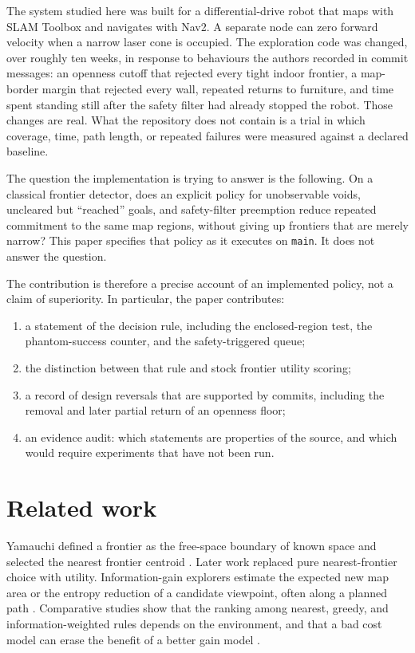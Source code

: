 \documentclass[11pt]{article}
\begin{document}
The system studied here was built for a differential-drive robot that maps with SLAM Toolbox and navigates with Nav2. A separate node can zero forward velocity when a narrow laser cone is occupied. The exploration code was changed, over roughly ten weeks, in response to behaviours the authors recorded in commit messages: an openness cutoff that rejected every tight indoor frontier, a map-border margin that rejected every wall, repeated returns to furniture, and time spent standing still after the safety filter had already stopped the robot. Those changes are real. What the repository does not contain is a trial in which coverage, time, path length, or repeated failures were measured against a declared baseline.

The question the implementation is trying to answer is the following. On a classical frontier detector, does an explicit policy for unobservable voids, uncleared but ``reached'' goals, and safety-filter preemption reduce repeated commitment to the same map regions, without giving up frontiers that are merely narrow? This paper specifies that policy as it executes on \texttt{main}. It does not answer the question.

The contribution is therefore a precise account of an implemented policy, not a claim of superiority. In particular, the paper contributes:
\begin{enumerate}
\item a statement of the decision rule, including the enclosed-region test, the phantom-success counter, and the safety-triggered queue;
\item the distinction between that rule and stock frontier utility scoring;
\item a record of design reversals that are supported by commits, including the removal and later partial return of an openness floor;
\item an evidence audit: which statements are properties of the source, and which would require experiments that have not been run.
\end{enumerate}

\section{Related work}
Yamauchi defined a frontier as the free-space boundary of known space and selected the nearest frontier centroid \cite{yamauchi1997,yamauchi1998}. Later work replaced pure nearest-frontier choice with utility. Information-gain explorers estimate the expected new map area or the entropy reduction of a candidate viewpoint, often along a planned path \cite{makarenko2002,stachniss2005,gonzalez2002}. Comparative studies show that the ranking among nearest, greedy, and information-weighted rules depends on the environment, and that a bad cost model can erase the benefit of a better gain model \cite{holz2010}.
\end{document}
